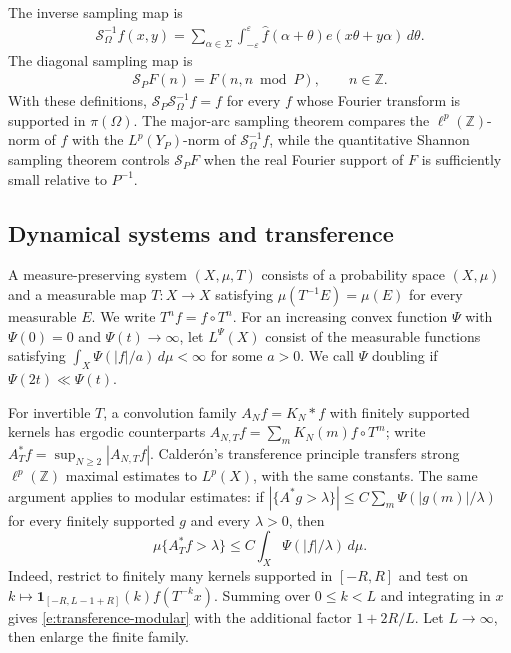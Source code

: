 \documentclass[12pt,reqno]{amsart}
\numberwithin{equation}{section}
\theoremstyle{definition}
\theoremstyle{remark}
\begin{document}
 
The inverse sampling map is
\begin{align}\label{e:IWinversesampling}
 \mathcal S_\Omega^{-1}f(x,y)
 =
 \sum_{\alpha\in\Sigma}
 \int_{-\varepsilon}^{\varepsilon}
 \widehat f(\alpha+\theta)
 e(x\theta+y\alpha)\,d\theta.
\end{align}
The diagonal sampling map is
\begin{align}\label{e:IWsampling}
 \mathcal S_PF(n)=F(n,n\bmod P),
 \qquad n\in\mathbb Z.
\end{align}
With these definitions, $ \mathcal S_P\mathcal S_\Omega^{-1}f=f$
for every \(f\) whose Fourier transform is supported in
\(\pi(\Omega)\).  The major-arc sampling theorem compares the
\(\ell^p(\mathbb Z)\)-norm of \(f\) with the
\(L^p(Y_P)\)-norm of \(\mathcal S_\Omega^{-1}f\), while the
quantitative Shannon sampling theorem controls
\(\mathcal S_PF\) when the real Fourier support of \(F\) is sufficiently
small relative to \(P^{-1}\).

\subsection{Dynamical systems and transference}
\label{ss:transference}

A measure-preserving system \((X,\mu,T)\) consists of a probability
space \((X,\mu)\) and a measurable map \(T:X\to X\) satisfying
\(\mu(T^{-1}E)=\mu(E)\) for every measurable \(E\).
We write \(T^nf=f\circ T^n\).
For an increasing convex function \(\Psi\) with \(\Psi(0)=0\)
and \(\Psi(t)\to\infty\), let \(L^\Psi(X)\) consist of the
measurable functions satisfying
\(\int_X\Psi(|f|/a)\,d\mu<\infty\) for some \(a>0\).
We call \(\Psi\) doubling if \(\Psi(2t)\ll\Psi(t)\).

For invertible \(T\), a convolution family \(A_Nf=K_N*f\)
with finitely supported kernels has ergodic counterparts
\(A_{N,T}f=\sum_mK_N(m)f\circ T^m\); write
\(A_T^*f=\sup_{N\geq2}|A_{N,T}f|\).
Calder\'on's transference principle \cite{Calderon1968}
transfers strong \(\ell^p(\mathbb Z)\) maximal estimates to
\(L^p(X)\), with the same constants.
The same argument applies to modular estimates: if
\(|\{A^*g>\lambda\}|\leq C\sum_m\Psi(|g(m)|/\lambda)\)
for every finitely supported \(g\) and every \(\lambda>0\), then
\begin{equation}\label{e:transference-modular}
 \mu\{A_T^*f>\lambda\}
 \leq C\int_X\Psi(|f|/\lambda)\,d\mu.
\end{equation}
Indeed, restrict to finitely many kernels supported in \([-R,R]\)
and test on
\(k\mapsto\mathbf1_{[-R,L-1+R]}(k)f(T^{-k}x)\).
Summing over \(0\leq k<L\) and integrating in \(x\) gives
\eqref{e:transference-modular} with the additional factor
\(1+2R/L\).  Let \(L\to\infty\), then enlarge the finite family.
\end{document}
